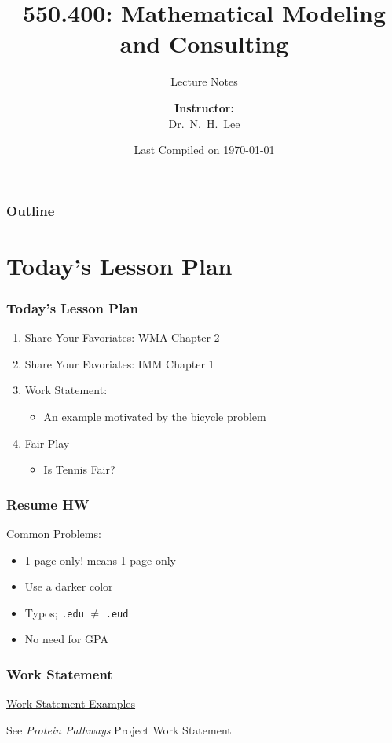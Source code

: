 \documentclass[hyperref={colorlinks=false},compress,handout,10pt]{beamer}
\title{{\color{blue} \LARGE 550.400: Mathematical Modeling and Consulting\newline} }
\subtitle{{\color{red} \large Lecture Notes} }
\author{ 
    {\bf{Instructor:}} \\ 
Dr.~N.~H.~Lee \\ 
    \vspace{5pt}
}
\institute{JHU AMS 2012 FALL}
\date{\mygreen Last Compiled on \today}
\let\olditem\item
\renewcommand{\item}{\setlength{\itemsep}{0.5\baselineskip}\olditem}
\begin{document}
\begin{frame}[plain]
  \titlepage
\end{frame}

\begin{frame}
  \frametitle{Outline}
  \tableofcontents
\end{frame}

\section{Today's Lesson Plan}
\begin{frame}%
    \frametitle{Today's Lesson Plan}
    \begin{enumerate}
        \item Share Your Favoriates: WMA Chapter 2
        \item Share Your Favoriates: IMM Chapter 1
        \item Work Statement: 
            \begin{itemize}
                \item An example motivated by the bicycle problem
            \end{itemize}
        \item Fair Play
             \begin{itemize}
                 \item Is Tennis Fair? 
             \end{itemize}
    \end{enumerate} 
\end{frame}

\begin{frame}
    \frametitle{Resume HW}
    Common Problems:
    \begin{itemize}
        \item 1 page only! means 1 page only
        \item Use a darker color
        \item Typos; \texttt{.edu} $\neq$ \texttt{.eud}
        \item No need for GPA 
    \end{itemize}
\end{frame}

\begin{frame}
    \frametitle{Work Statement}
    \begin{center}
        \href{http://www.ipam.ucla.edu/programs/rips2002/rips2002_projects.html}{Work Statement Examples}
    \end{center}
    \begin{description}
        \item[\quad] See \emph{Protein Pathways} Project Work Statement 
    \end{description}
\end{frame}
\end{document}
